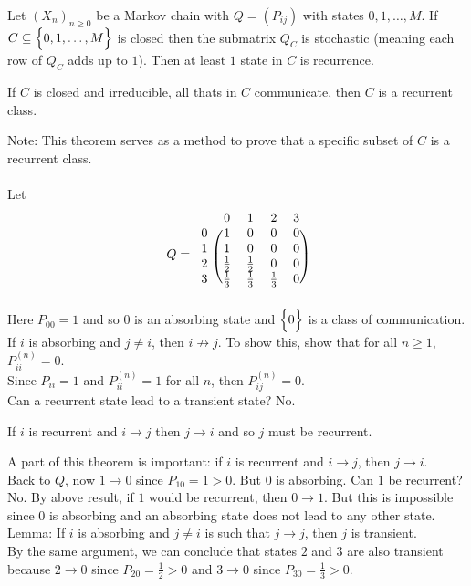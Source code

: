 \documentclass[12pt]{article}
\begin{document}
Let $(X_n)_{n\geq 0}$ be a Markov chain with $Q = (P_{ij})$ with states $0,1,\dots,M$. If $C \subseteq \Big\{ 0,1,\dots,M \Big\}$ is closed then the submatrix $Q_C$ is stochastic (meaning each row of $Q_C$ adds up to $1$). Then at least $1$ state in $C$ is recurrence. 
\begin{theorem} If $C$ is closed and irreducible, all thats in $C$ communicate, then $C$ is a recurrent class. \end{theorem} 
Note: This theorem serves as a method to prove that a specific subset of $C$ is a recurrent class. \\~\\
Let $$Q = \begin{blockarray}{ccccc}
&0&1&2&3 \\
\begin{block}{c(cccc)}
0 & 1 & 0 & 0 & 0 \\
1 & 1 & 0 & 0 & 0 \\ 
2 & \frac{1}{2} & \frac{1}{2} & 0 & 0 \\ 
3 & \frac{1}{3} & \frac{1}{3} & \frac{1}{3} & 0 \\ \end{block} \end{blockarray} $$
Here $P_{00} = 1$ and so $0$ is an absorbing state and $\Big\{ 0 \Big\}$ is a class of communication. \\
If $i$ is absorbing and $j \neq i$, then $i \not\to j$. To show this, show that for all $n \geq 1$, $P_{ii}^{(n)} = 0$. \\ Since $P_{ii} = 1$ and $P_{ii}^{(n)} = 1$ for all $n$, then $P_{ij}^{(n)} = 0$. \\
Can a recurrent state lead to a transient state? No. 
\begin{theorem} If $i$ is recurrent and $i \to j$ then $j \to i$ and so $j$ must be recurrent. \end{theorem} 
A part of this theorem is important: if $i$ is recurrent and $i \to j$, then $j \to i$. \\
Back to $Q$, now $1 \to 0$ since $P_{10} = 1 > 0$. But $0$ is absorbing. Can $1$ be recurrent? No. By above result, if $1$ would be recurrent, then $0 \to 1$. But this is impossible since $0$ is absorbing and an absorbing state does not lead to any other state. \\
Lemma: If $i$ is absorbing and $j \neq i$ is such that $j \to j$, then $j$ is transient. \\
By the same argument, we can conclude that states $2$ and $3$ are also transient because $2 \to 0$ since $P_{20} = \frac{1}{2} > 0$ and $3 \to 0$ since $P_{30} = \frac{1}{3} > 0$. \\~\\
\end{document}
